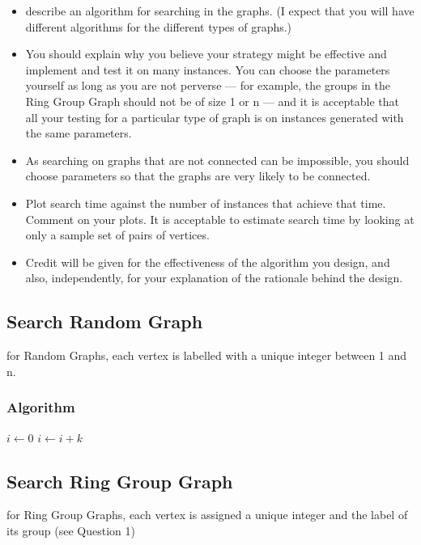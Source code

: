 \documentclass[11pt,a4paper,notitlepage]{article}
\begin{document}
\begin{itemize}
    \item describe an algorithm for searching in the graphs. (I expect that you will have different algorithms for the different types of graphs.) 
    \item You should explain why you believe your strategy might be effective and implement and test it on many instances. You can choose the parameters yourself as long as you are not perverse — for example, the groups in the Ring Group Graph should not be of size 1 or n — and it is acceptable that all your testing for a particular type of graph is on instances generated with the same parameters. 
    \item As searching on graphs that are not connected can be impossible, you should choose parameters so that the graphs are very likely to be connected. 
    \item Plot search time against the number of instances that achieve that time. Comment on your plots. It is acceptable to estimate search time by looking at only a sample set of pairs of vertices. 
    \item Credit will be given for the effectiveness of the algorithm you design, and also, independently, for your explanation of the rationale behind the design.
\end{itemize}

\subsection*{Search Random Graph}
for Random Graphs, each vertex is labelled with a unique integer between 1 and n.
\subsubsection*{Algorithm}

\begin{algorithmic}
        \State $i\gets 0$
    \Else
            \State $i\gets i+k$
        \EndIf
    \EndIf
\end{algorithmic}

\subsection*{Search Ring Group Graph}
for Ring Group Graphs, each vertex is assigned a unique integer and the label of its group (see
Question 1)
\end{document}
